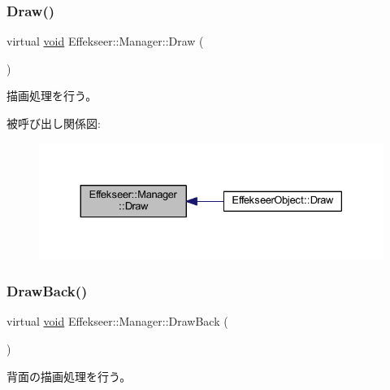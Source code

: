 \subsubsection{\texorpdfstring{Draw()}{Draw()}}
{\footnotesize\ttfamily virtual \mbox{\hyperlink{namespace_effekseer_ab34c4088e512200cf4c2716f168deb56}{void}} Effekseer\+::\+Manager\+::\+Draw (\begin{DoxyParamCaption}{ }\end{DoxyParamCaption})\hspace{0.3cm}{\ttfamily [pure virtual]}}



描画処理を行う。 

被呼び出し関係図\+:\nopagebreak
\begin{figure}[H]
\begin{center}
\leavevmode
\includegraphics[width=330pt]{class_effekseer_1_1_manager_a17431b7d96325535fa62bcbb066f0a9c_icgraph}
\end{center}
\end{figure}
\mbox{\label{class_effekseer_1_1_manager_abcb4f71e94b1ff2ee3b8088fc53f4841}} 
\subsubsection{\texorpdfstring{Draw\+Back()}{DrawBack()}}
{\footnotesize\ttfamily virtual \mbox{\hyperlink{namespace_effekseer_ab34c4088e512200cf4c2716f168deb56}{void}} Effekseer\+::\+Manager\+::\+Draw\+Back (\begin{DoxyParamCaption}{ }\end{DoxyParamCaption})\hspace{0.3cm}{\ttfamily [pure virtual]}}



背面の描画処理を行う。 

\mbox{\label{class_effekseer_1_1_manager_a44504a565c73f56ab6ddd8b90648d6fc}} 
